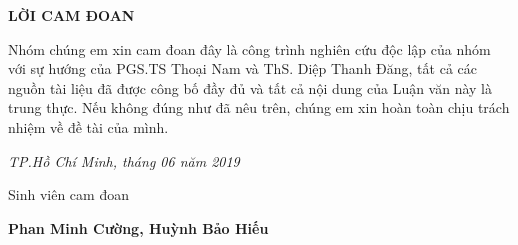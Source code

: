 \centerline{\bf \large\MakeUppercase{Lời cam đoan}}

\vspace{20pt}

Nhóm chúng em xin cam đoan đây là công trình nghiên cứu độc lập của nhóm với sự hướng của PGS.TS Thoại Nam và ThS. Diệp Thanh Đăng, tất cả các nguồn tài liệu đã được công bố đầy đủ và tất cả nội dung của Luận văn này là trung thực. Nếu không đúng như đã nêu trên, chúng em xin hoàn toàn chịu trách nhiệm về đề tài của mình.

\begin{flushright}
	{\it TP.Hồ Chí Minh, tháng 06 năm 2019}
	
	Sinh viên cam đoan \hskip 2cm\quad
	
	\vskip 1cm
	{\bf Phan Minh Cường, Huỳnh Bảo Hiếu} \quad\ 
\end{flushright}
